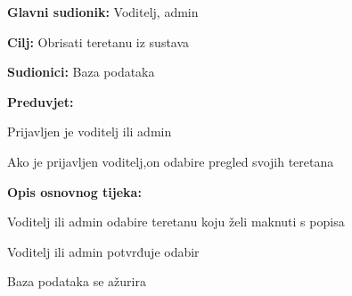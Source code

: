 					\noindent {}
					\begin{packed_item}
	
						\item \textbf{Glavni sudionik: } Voditelj, admin
						\item  \textbf{Cilj:} Obrisati teretanu iz sustava
						\item  \textbf{Sudionici:} Baza podataka
						\item  \textbf{Preduvjet:}
						\item[] \begin{packed_enum}
	
							\item Prijavljen je voditelj ili admin
							\item Ako je prijavljen voditelj,on odabire pregled svojih teretana


						\end{packed_enum}
						\item  \textbf{Opis osnovnog tijeka:}
						
						\item[] \begin{packed_enum}
	
							\item Voditelj ili admin odabire teretanu koju želi maknuti s popisa
							\item Voditelj ili admin potvrđuje odabir

							\item Baza podataka se ažurira
						\end{packed_enum}
						
					\end{packed_item}
					
